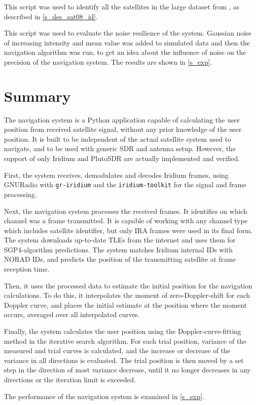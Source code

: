  This script was used to identify all the satellites in the large dataset from \cite{sat08}, as described in \autoref{s_des_sat08_id}.

 This script was used to evaluate the noise resilience of the system. Gaussian noise of increasing intensity and mean value was added to simulated data and then the navigation algorithm was run, to get an idea about the influence of noise on the precision of the navigation system. The results are shown in \autoref{s_exp}.

\section{Summary}
The navigation system is a Python application capable of calculating the user position from received satellite signal, without any prior knowledge of the user position. It is built to be independent of the actual satellite system used to navigate, and to be used with generic SDR and antenna setup. However, the support of only Iridium and PlutoSDR are actually implemented and verified.

First, the system receives, demodulates and decodes Iridium frames, using GNURadio with \texttt{gr-iridium} and the \texttt{iridium-toolkit} for the signal and frame processing.

Next, the navigation system processes the received frames. It identifies on which channel was a frame transmitted. It is capable of working with any channel type which includes satellite identifier, but only IRA frames were used in its final form. The system downloads up-to-date TLEs from the internet and uses them for SGP4-algorithm predictions. The system matches Iridium internal IDs with NORAD IDs, and predicts the position of the transmitting satellite at frame reception time.

Then, it uses the processed data to estimate the initial position for the navigation calculations. To do this, it interpolates the moment of zero-Doppler-shift for each Doppler curve, and places the initial estimate at the position where the moment occurs, averaged over all interpolated curves.

Finally, the system calculates the user position using the Doppler-curve-fitting method in the iterative search algorithm. For each trial position, variance of the measured and trial curves is calculated, and the increase or decrease of the variance in all directions is evaluated. The trial position is then moved by a set step in the direction of most variance decrease, until it no longer decreases in any directions or the iteration limit is exceeded.

The performance of the navigation system is examined in \autoref{s_exp}.
